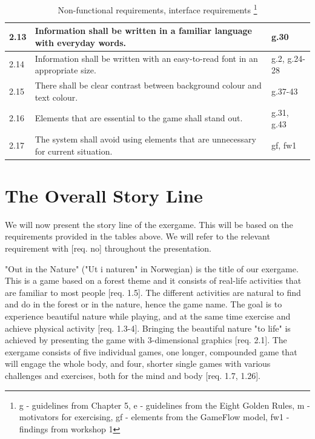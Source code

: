 \begin{minipage}{12 cm}
\begin{table} [H]
\centering
\begin{tabular}{|>{\raggedright}p{}|p{}|p{}|} 
\hline
2.13 & Information shall be written in a familiar language with everyday words. & g.30\\ \hline
2.14 & Information shall be written with an easy-to-read font in an appropriate size. &  g.2, g.24-28\\ \hline
2.15 & There shall be clear contrast between background colour and text colour. & g.37-43 \\ \hline
2.16 & Elements that are essential to the game shall stand out. & g.31, g.43\\ \hline
2.17 & The system shall avoid using elements that are unnecessary for current situation.  & gf, fw1\\ \hline
\end{tabular}
\caption[Non-functional requirements, part 2]{Non-functional requirements, interface requirements \footnote{g - guidelines from Chapter 5, e - guidelines from the Eight Golden Rules, m - motivators for exercising, gf - elements from the GameFlow model, fw1 - findings from workshop 1}}
\label{tab:nonfunc2}
\end{table} 
\end{minipage}

\section{The Overall Story Line}
\label{sec:outinthenature}
We will now present the story line of the exergame. This will be based on the requirements provided in the tables above. We will refer to the relevant requirement with [req. no] throughout the presentation. 

"Out in the Nature" ("Ut i naturen" in Norwegian) is the title of our exergame. This is a game based on a forest theme and it consists of real-life activities that are familiar to most people [req. 1.5]. The different activities are natural to find and do in the forest or in the nature, hence the game name. The goal is to experience beautiful nature while playing, and at the same time exercise and achieve physical activity [req. 1.3-4]. Bringing the beautiful nature "to life" is achieved by presenting the game with 3-dimensional graphics [req. 2.1]. The exergame consists of five individual games, one longer, compounded game that will engage the whole body, and four, shorter single games with various challenges and exercises, both for the mind and body [req. 1.7, 1.26].        

